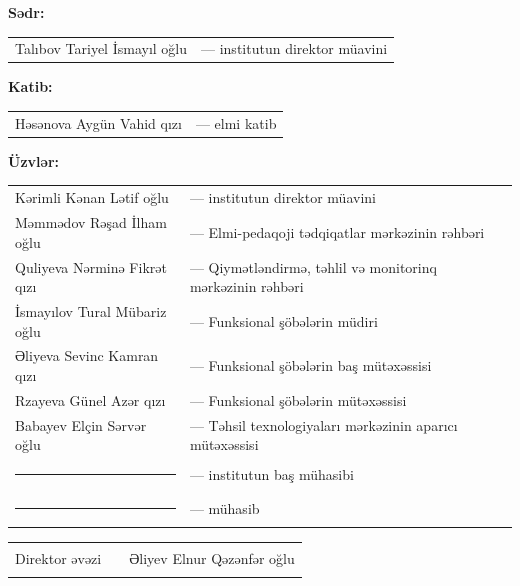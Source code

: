\documentclass[12pt,a4paper]{article}
\newcommand{\adxetti}{\rule{52mm}{0.4pt}}
\newcommand{\imzaxetti}{\rule{40mm}{0.4pt}}
\begin{document}
\begin{flushleft}
\textbf{Sədr:}\\[3pt]
\begin{tabular}{@{}p{68mm}p{96mm}@{}}
  Talıbov Tariyel İsmayıl oğlu & --- institutun direktor müavini \\
\end{tabular}

\vspace{10pt}
\textbf{Katib:}\\[3pt]
\begin{tabular}{@{}p{68mm}p{96mm}@{}}
  Həsənova Aygün Vahid qızı & --- elmi katib \\
\end{tabular}

\vspace{14pt}
\textbf{Üzvlər:}\\[3pt]
\begin{tabular}{@{}p{68mm}p{96mm}@{}}
  Kərimli Kənan Lətif oğlu & --- institutun direktor müavini \\
  Məmmədov Rəşad İlham oğlu & --- Elmi-pedaqoji tədqiqatlar mərkəzinin rəhbəri \\
  Quliyeva Nərminə Fikrət qızı & --- Qiymətləndirmə, təhlil və monitorinq mərkəzinin rəhbəri \\
  İsmayılov Tural Mübariz oğlu & --- Funksional şöbələrin müdiri \\
  Əliyeva Sevinc Kamran qızı & --- Funksional şöbələrin baş mütəxəssisi \\
  Rzayeva Günel Azər qızı & --- Funksional şöbələrin mütəxəssisi \\
  Babayev Elçin Sərvər oğlu & --- Təhsil texnologiyaları mərkəzinin aparıcı mütəxəssisi \\
  \adxetti & --- institutun baş mühasibi \\
  \adxetti & --- mühasib \\
\end{tabular}
\end{flushleft}

\vspace{20pt}

\begin{flushleft}
\begin{tabular}{@{}p{60mm}p{45mm}p{62mm}@{}}
  Direktor əvəzi & \imzaxetti & Əliyev Elnur Qəzənfər oğlu \\
\end{tabular}
\end{flushleft}
\end{document}
